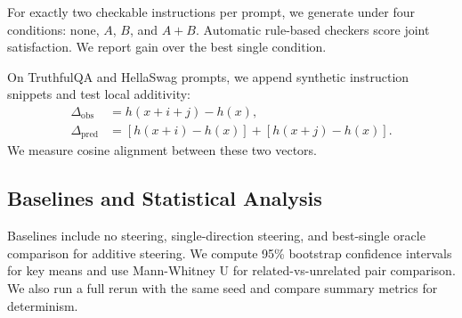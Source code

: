 For exactly two checkable instructions per prompt, we generate under four conditions: none, $A$, $B$, and $A{+}B$. Automatic rule-based checkers score joint satisfaction. We report gain over the best single condition.

On TruthfulQA and HellaSwag prompts, we append synthetic instruction snippets and test local additivity:
\begin{align}
\Delta_{\text{obs}} &= h(x+i+j)-h(x), \\
\Delta_{\text{pred}} &= [h(x+i)-h(x)] + [h(x+j)-h(x)].
\end{align}
We measure cosine alignment between these two vectors.

\subsection{Baselines and Statistical Analysis}
Baselines include no steering, single-direction steering, and best-single oracle comparison for additive steering. We compute 95\% bootstrap confidence intervals for key means and use Mann-Whitney U for related-vs-unrelated pair comparison. We also run a full rerun with the same seed and compare summary metrics for determinism.
